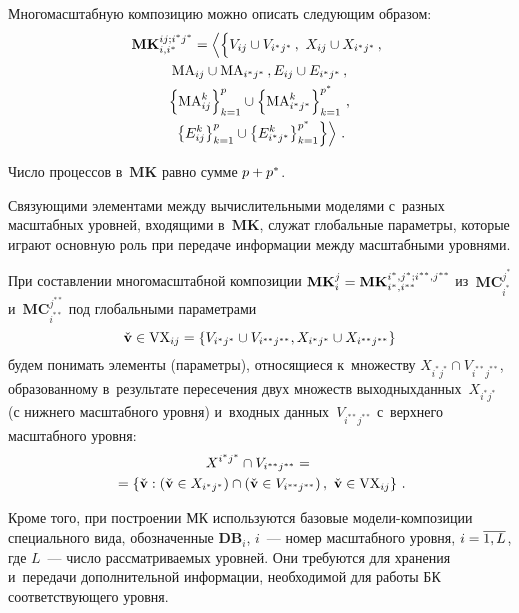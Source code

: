 \begin{multicols}{2}
   Многомасштабную композицию можно описать следующим образом:
   \begin{multline*}
   \mathbf{MK}_{i,i^*}^{ij; i^*j^*}=\left\langle 
   \left\{ 
   \vphantom{\left\{ 
E^k_{i^*j^*}\right\}^{p^*}_{k=1}}
V_{ij}\cup V_{i^*j^*}\,,\ 
X_{ij}\cup X_{i^*j^*}\,,\right.\right.\\
  \mathrm{MA}_{ij}\cup \mathrm{MA}_{i^*j^*}\,,
 E_{ij}\cup E_{i^*j^*}\,,\\
\left\{ \mathrm{MA}_{ij}^k\right\}^p_{k=1}\cup \left\{ 
\mathrm{MA}^k_{i^*j^*}\right\}_{k=1}^{p^*}\,,\\
   \left.\left. \left\{ E^k_{ij}\right\}^p_{k=1}\cup \left\{ 
E^k_{i^*j^*}\right\}^{p^*}_{k=1}\right\}\right\rangle\,.
   \end{multline*}
   
   Число процессов в~$\mathbf{MK}$ равно сумме $p\hm+p^*$.
   
   Связующими элементами между вычислительными моделями с~разных 
масштабных уровней, входящими в~$\mathbf{MK}$, служат глобальные 
параметры, которые играют основную роль при передаче информации между 
масштабными уровнями.
   
   При составлении многомасштабной композиции 
   $\mathbf{MK}_i^j\hm= 
\mathbf{MK}^{i^*, j^*; i^{**}, j^{**}}_{i^*,i^{**}}$ 
из~$\mathbf{MC}_{i^*}^{j^*}$ и~$\mathbf{MC}^{j^{**}}_{i^{**}}$ под 
глобальными параметрами 
$$
\Check{\mathbf{v}}\in \mathrm{VX}_{ij} = \left\{ 
V_{i^*j^*}\cup V_{i^{**}j^{**}}, X_{i^*j^*}\cup X_{i^{**}j^{**}}\right\}
$$ 
будем 
понимать элементы (параметры), относящиеся к~множеству $X_{i^*j^*}\cap 
V_{i^{**}j^{**}}$, образованному в~результате пересечения двух множеств 
выходных\linebreak данных~$X_{i^*j^*}$ (с нижнего масштабного уровня) и~входных 
данных~$V_{i^{**}j^{**}}$ с~верхнего масштабного уровня:
   \begin{multline*}
   X^{i^*j^*}\cap V_{i^{**}j^{**}}={}\\
   {}=\left\{ \Check{\mathbf{v}}: \left( 
\Check{\mathbf{v}}\in X_{i^*j^*}\right) \cap \left( \Check{\mathbf{v}}\in 
V_{i^{**}j^{**}}\right),\ \Check{\mathbf{v}}\in \mathrm{VX}_{ij}\right\}\,.
\end{multline*}
   
   Кроме того, при построении МК используются 
базовые мо\-де\-ли-ком\-по\-зи\-ции специального вида, обозначенные 
$\mathbf{DB}_i$, $i$~--- номер масштабного уровня, $i\hm=\overline{1,L}$, где 
$L$~--- чис\-ло рас\-смат\-ри\-ва\-емых уровней. Они требуются для хранения и~передачи 
дополнительной информации, необходимой для работы БК со\-от\-вет\-ст\-ву\-юще\-го 
уровня.
   

\end{multicols}
